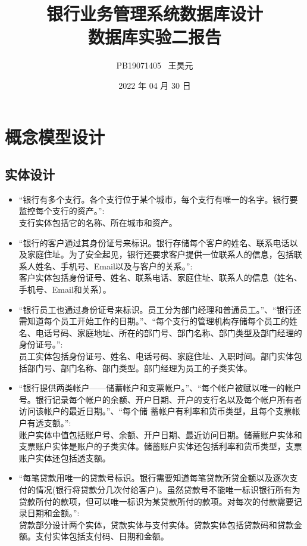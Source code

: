 \documentclass{article}
\title{银行业务管理系统数据库设计 \\ {\small 数据库实验二报告}}
\author{PB19071405 \ 王昊元}
\date{2022 年 04 月 30 日}
\begin{document}
    \maketitle

    \section{概念模型设计}
    \subsection{实体设计}
    \begin{itemize}
        \item ``银行有多个支行。各个支行位于某个城市，每个支行有唯一的名字。银行要监控每个支行的资产。'': \\
        支行实体包括它的名称、所在城市和资产。
        \item ``银行的客户通过其身份证号来标识。银行存储每个客户的姓名、联系电话以及家庭住址。为了安全起见，银行还要求客户提供一位联系人的信息，包括联系人姓名、手机号、Email以及与客户的关系。'': \\
        客户实体包括身份证号、姓名、联系电话、家庭住址、联系人的信息（姓名、手机号、Email和关系）。
        \item ``银行员工也通过身份证号来标识。员工分为部门经理和普通员工。''、``银行还需知道每个员工开始工作的日期。''、``每个支行的管理机构存储每个员工的姓名、电话号码、家庭地址、所在的部门号、部门名称、部门类型及部门经理的身份证号。'': \\
        员工实体包括身份证号、姓名、电话号码、家庭住址、入职时间。部门实体包括部门号、部门名称、部门类型。部门经理为员工的子类实体。
        \item ``银行提供两类帐户——储蓄帐户和支票帐户。''、``每个帐户被赋以唯一的帐户号。银行记录每个帐户的余额、开户日期、开户的支行名以及每个帐户所有者访问该帐户的最近日期。''、``每个储 蓄帐户有利率和货币类型，且每个支票帐户有透支额。'': \\
        账户实体中值包括账户号、余额、开户日期、最近访问日期。储蓄账户实体和支票账户实体是账户的子类实体。储蓄账户实体还包括利率和货币类型，支票账户实体还包括透支额。
        \item ``每笔贷款用唯一的贷款号标识。银行需要知道每笔贷款所贷金额以及逐次支付的情况(银行将贷款分几次付给客户)。虽然贷款号不能唯一标识银行所有为贷款所付的款项，但可以唯一标识为某贷款所付的款项。对每次的付款需要记录日期和金额。'': \\
        贷款部分设计两个实体，贷款实体与支付实体。贷款实体包括贷款码和贷款金额。支付实体包括支付码、日期和金额。
    \end{itemize}
\end{document}
